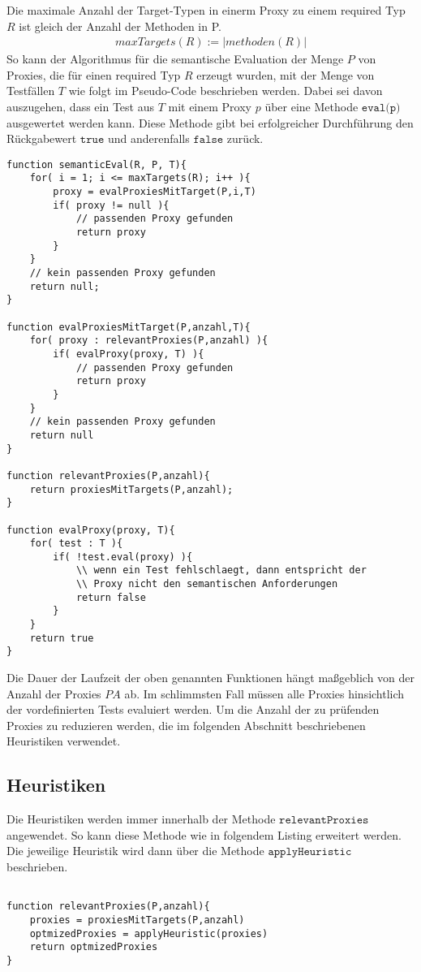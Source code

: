 \documentclass[a4paper,12pt]{article}
\begin{document}
Die maximale Anzahl der Target-Typen in einerm Proxy zu einem required Typ $R$ ist gleich der Anzahl der Methoden in P.
\begin{gather*}
maxTargets(R) := |\mathit{methoden(R)}|
\end{gather*}
So kann der Algorithmus für die semantische Evaluation der Menge $P$ von Proxies, die für einen required Typ $R$ erzeugt wurden, mit der Menge von Testfällen $T$ wie folgt im Pseudo-Code beschrieben werden. Dabei sei davon auszugehen, dass ein Test aus $T$ mit einem Proxy $p$ über eine Methode $\texttt{eval(p)}$ ausgewertet werden kann. Diese Methode gibt bei erfolgreicher Durchführung den Rückgabewert $\texttt{true}$ und anderenfalls $\texttt{false}$ zurück.
\begin{lstlisting}[style = pseudo]
function semanticEval(R, P, T){
	for( i = 1; i <= maxTargets(R); i++ ){
		proxy = evalProxiesMitTarget(P,i,T)	
		if( proxy != null ){
			// passenden Proxy gefunden
			return proxy
		}
	}
	// kein passenden Proxy gefunden
	return null;
}

function evalProxiesMitTarget(P,anzahl,T){
	for( proxy : relevantProxies(P,anzahl) ){
		if( evalProxy(proxy, T) ){
			// passenden Proxy gefunden
			return proxy
		}
	}
	// kein passenden Proxy gefunden
	return null
}

function relevantProxies(P,anzahl){
	return proxiesMitTargets(P,anzahl);
}

function evalProxy(proxy, T){
	for( test : T ){
		if( !test.eval(proxy) ){
			\\ wenn ein Test fehlschlaegt, dann entspricht der 
			\\ Proxy nicht den semantischen Anforderungen
			return false
		}
	}
	return true
}
\end{lstlisting}
Die Dauer der Laufzeit der oben genannten Funktionen hängt maßgeblich von der Anzahl der Proxies $\mathit{PA}$ ab. Im schlimmsten Fall müssen alle Proxies hinsichtlich der vordefinierten Tests evaluiert werden. Um die Anzahl der zu prüfenden Proxies zu reduzieren werden, die im folgenden Abschnitt beschriebenen Heuristiken verwendet.

\subsection{Heuristiken}
Die Heuristiken werden immer innerhalb der Methode $\texttt{relevantProxies}$ angewendet. So kann diese Methode wie in folgendem Listing erweitert werden. Die jeweilige Heuristik wird dann über die Methode $\texttt{applyHeuristic}$ beschrieben.
\begin{lstlisting}[style = pseudo]

function relevantProxies(P,anzahl){
	proxies = proxiesMitTargets(P,anzahl)
	optmizedProxies = applyHeuristic(proxies)
	return optmizedProxies
}

\end{lstlisting}
\end{document}
